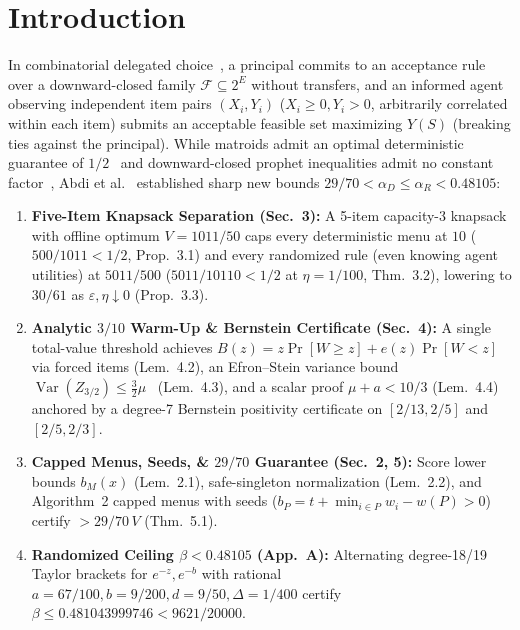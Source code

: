 \documentclass[10pt,twocolumn]{article}
\begin{document}
\section{Introduction}\label{sec:intro}
In combinatorial delegated choice~\cite{holmstrom1984delegation,kleinberg2018delegated,banihashem2025delegated}, a principal commits to an acceptance rule over a downward-closed family $\mathcal{F} \subseteq 2^E$ without transfers, and an informed agent observing independent item pairs $(X_i, Y_i)$ ($X_i \ge 0, Y_i > 0$, arbitrarily correlated within each item) submits an acceptable feasible set maximizing $Y(S)$ (breaking ties against the principal). While matroids admit an optimal deterministic guarantee of $1/2$~\cite{bechtel2021delegated,abdi2026matroid} and downward-closed prophet inequalities admit no constant factor~\cite{rubinstein2016beyond}, Abdi et al.~\cite{abdi2026downward} established sharp new bounds $29/70 < \alpha_D \le \alpha_R < 0.48105$:
\begin{enumerate}[leftmargin=*,nosep]
  \item \textbf{Five-Item Knapsack Separation (Sec.~3):} A 5-item capacity-3 knapsack with offline optimum $V = 1011/50$ caps every deterministic menu at $10$ ($500/1011 < 1/2$, Prop.~3.1) and every randomized rule (even knowing agent utilities) at $5011/500$ ($5011/10110 < 1/2$ at $\eta = 1/100$, Thm.~3.2), lowering to $30/61$ as $\varepsilon, \eta \downarrow 0$ (Prop.~3.3).
  \item \textbf{Analytic $3/10$ Warm-Up \& Bernstein Certificate (Sec.~4):} A single total-value threshold achieves $B(z) = z\Pr[W \ge z] + e(z)\Pr[W < z]$ via forced items (Lem.~4.2), an Efron--Stein variance bound $\operatorname{Var}(Z_{3/2}) \le \frac{3}{2}\mu$~\cite{efron1981jackknife} (Lem.~4.3), and a scalar proof $\mu + a < 10/3$ (Lem.~4.4) anchored by a degree-7 Bernstein positivity certificate on $[2/13, 2/5]$ and $[2/5, 2/3]$.
  \item \textbf{Capped Menus, Seeds, \& $29/70$ Guarantee (Sec.~2, 5):} Score lower bounds $b_M(x)$ (Lem.~2.1), safe-singleton normalization (Lem.~2.2), and Algorithm~2 capped menus with seeds ($b_P = t + \min_{i\in P} w_i - w(P) > 0$) certify $> 29/70\,V$ (Thm.~5.1).
  \item \textbf{Randomized Ceiling $\beta < 0.48105$ (App.~A):} Alternating degree-18/19 Taylor brackets for $e^{-z}, e^{-b}$ with rational $a = 67/100, b = 9/200, d = 9/50, \Delta = 1/400$ certify $\beta \le 0.481043999746 < 9621/20000$.
\end{enumerate}
\end{document}
